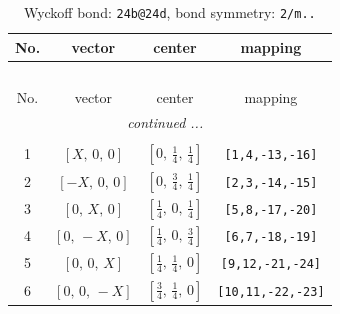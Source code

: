 \documentclass[fleqn,8pt]{jsarticle}
\begin{document}
\renewcommand{\arraystretch}{1.2}
\begin{longtable}{cccc}
\caption{Wyckoff bond: {\tt 24b@24d}, bond symmetry: {\tt 2/m..}}
 \\
 \hline \hline
No. & vector & center & mapping \\ \hline \endfirsthead

\multicolumn{3}{l}{\tablename\ \thetable{}} \\
 \hline \hline
No. & vector & center & mapping \\ \hline \endhead

 \hline \hline
\multicolumn{3}{r}{\footnotesize\it continued ...} \\ \endfoot

 \hline \hline
\multicolumn{3}{r}{} \\ \endlastfoot

1 & $\left[ X,\, 0,\, 0 \right]$ & $\left[ 0,\, \frac{1}{4},\, \frac{1}{4} \right]$ & {\tt [1,4,-13,-16]} \\ \hline
2 & $\left[ - X,\, 0,\, 0 \right]$ & $\left[ 0,\, \frac{3}{4},\, \frac{1}{4} \right]$ & {\tt [2,3,-14,-15]} \\ \hline
3 & $\left[ 0,\, X,\, 0 \right]$ & $\left[ \frac{1}{4},\, 0,\, \frac{1}{4} \right]$ & {\tt [5,8,-17,-20]} \\ \hline
4 & $\left[ 0,\, - X,\, 0 \right]$ & $\left[ \frac{1}{4},\, 0,\, \frac{3}{4} \right]$ & {\tt [6,7,-18,-19]} \\ \hline
5 & $\left[ 0,\, 0,\, X \right]$ & $\left[ \frac{1}{4},\, \frac{1}{4},\, 0 \right]$ & {\tt [9,12,-21,-24]} \\ \hline
6 & $\left[ 0,\, 0,\, - X \right]$ & $\left[ \frac{3}{4},\, \frac{1}{4},\, 0 \right]$ & {\tt [10,11,-22,-23]} \\
\end{longtable}
\renewcommand{\arraystretch}{1.2}
\end{document}
